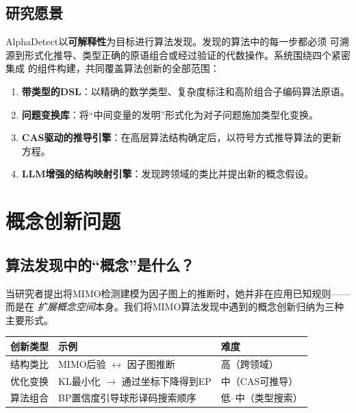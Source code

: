 \documentclass[12pt,a4paper]{article}
\begin{document}
\subsection{研究愿景}

AlphaDetect以\textbf{可解释性}为目标进行算法发现。发现的算法中的每一步都必须
可溯源到形式化推导、类型正确的原语组合或经过验证的代数操作。系统围绕四个紧密集成
的组件构建，共同覆盖算法创新的全部范围：
\begin{enumerate}[leftmargin=2em, itemsep=0pt]
  \item \textbf{带类型的DSL}：以精确的数学类型、复杂度标注和高阶组合子编码算法原语。
  \item \textbf{问题变换库}：将``中间变量的发明''形式化为对子问题施加类型化变换。
  \item \textbf{CAS驱动的推导引擎}：在高层算法结构确定后，以符号方式推导算法的更新方程。
  \item \textbf{LLM增强的结构映射引擎}：发现跨领域的类比并提出新的概念假设。
\end{enumerate}

\section{概念创新问题}
\label{sec:concept}

\subsection{算法发现中的``概念''是什么？}

当研究者提出将MIMO检测建模为因子图上的推断时，她并非在应用已知规则——而是在
\emph{扩展概念空间}本身。我们将MIMO算法发现中遇到的概念创新归纳为三种主要形式。

\vspace{0.5em}
\begin{tabular}{@{}p{3.5cm}p{6.5cm}p{3.0cm}@{}}
  \toprule
  \textbf{创新类型} & \textbf{示例} & \textbf{难度} \\
  \midrule
  结构类比 & MIMO后验 $\leftrightarrow$ 因子图推断
    & 高（跨领域） \\
  优化变换 & KL最小化 $\to$ 通过坐标下降得到EP
    & 中（CAS可推导） \\
  算法组合 & BP置信度引导球形译码搜索顺序
    & 低--中（类型搜索） \\
  \bottomrule
\end{tabular}
\vspace{0.5em}
\end{document}
